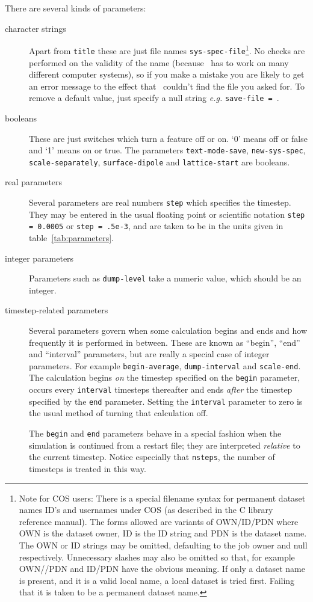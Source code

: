 There are several kinds of parameters:
\begin{description}

\item[character strings] Apart from \verb'title' these are just file
names \eg \verb'sys-spec-file'\footnote{Note for COS users: There is a
special filename syntax for permanent dataset names ID's and usernames
under COS (as described in the C library reference manual). The forms
allowed are variants of OWN/ID/PDN where OWN is the dataset owner, ID
is the ID string and PDN is the dataset name.  The OWN or ID strings
may be omitted, defaulting to the job owner and null respectively.
Unnecessary slashes may also be omitted so that, for example OWN//PDN
and ID/PDN have the obvious meaning. If only a dataset name is
present, and it is a valid local name, a local dataset is tried first.
Failing that it is taken to be a permanent dataset name.}.  No checks
are performed on the validity of the name (because \moldy\  has to work
on many different computer systems), so if you make a mistake you are
likely to get an error message to the effect that \moldy\  couldn't find
the file you asked for.  To remove a default value, just specify a
null string {\em e.g.} \verb'save-file = '.

\item[booleans] These are just switches which turn a feature off or
on. `0' means off or false and `1' means on or true. The parameters
\verb'text-mode-save', \verb'new-sys-spec', \verb'scale-separately',
\verb'surface-dipole' and \verb'lattice-start' are booleans.

\item[real parameters] Several parameters are real numbers \eg
\verb'step' which specifies the timestep.  They may be entered in the
usual floating point or scientific notation \eg \mbox{\verb'step = 0.0005'}
or \mbox{\verb'step = .5e-3'}, and are taken to be in the units given in
table~\ref{tab:parameters}.

\item[integer parameters] Parameters such as \verb'dump-level' take a
numeric value, which should be an integer.

\item[timestep-related parameters] Several parameters govern when some
calculation begins and ends and how frequently it is performed in
between. These are known as ``begin'', ``end'' and ``interval''
parameters, but are really a special case of integer parameters.  For
example \verb'begin-average', \verb'dump-interval' and
\verb'scale-end'.  The calculation begins {\em on} the timestep
specified on the \verb'begin' parameter, occurs every \verb'interval'
timesteps thereafter and ends {\em after} the timestep specified by
the \verb'end' parameter.  Setting the \verb'interval' parameter to
zero is the usual method of turning that calculation off.

The \verb'begin' and \verb'end' parameters behave in a special fashion
when the simulation is continued from a restart file; they are
interpreted {\em relative} to the current timestep.  Notice especially
that \verb'nsteps', the number of timesteps is treated in this way.

\end{description}

